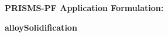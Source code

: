 \documentclass[10pt]{article}
\begin{document}
\def\Bomega{\mbox{\boldmath$\omega$}}
\def\Bvarepsilon{\mbox{\boldmath$\varepsilon$}}
\def\Bvartheta{\mbox{\boldmath$\vartheta$}}
\def\Bvarpi{\mbox{\boldmath$\varpi$}}
\def\Bvarrho{\mbox{\boldmath$\varrho$}}
\def\Bvarsigma{\mbox{\boldmath$\varsigma$}}
\def\Bvarphi{\mbox{\boldmath$\varphi$}}
\def\bone{\mathbf{1}}
\def\bzero{\mathbf{0}}
\def\bA{\mbox{\boldmath$ A$}}
\def\bB{\mbox{\boldmath$ B$}}
\def\bC{\mbox{\boldmath$ C$}}
\def\bD{\mbox{\boldmath$ D$}}
\def\bE{\mbox{\boldmath$ E$}}
\def\bF{\mbox{\boldmath$ F$}}
\def\bG{\mbox{\boldmath$ G$}}
\def\bH{\mbox{\boldmath$ H$}}
\def\bI{\mbox{\boldmath$ I$}}
\def\bJ{\mbox{\boldmath$ J$}}
\def\bK{\mbox{\boldmath$ K$}}
\def\bL{\mbox{\boldmath$ L$}}
\def\bM{\mbox{\boldmath$ M$}}
\def\bN{\mbox{\boldmath$ N$}}
\def\bO{\mbox{\boldmath$ O$}}
\def\bP{\mbox{\boldmath$ P$}}
\def\bQ{\mbox{\boldmath$ Q$}}
\def\bR{\mbox{\boldmath$ R$}}
\def\bS{\mbox{\boldmath$ S$}}
\def\bT{\mbox{\boldmath$ T$}}
\def\bU{\mbox{\boldmath$ U$}}
\def\bV{\mbox{\boldmath$ V$}}
\def\bW{\mbox{\boldmath$ W$}}
\def\bX{\mbox{\boldmath$ X$}}
\def\bY{\mbox{\boldmath$ Y$}}
\def\bZ{\mbox{\boldmath$ Z$}}
\def\ba{\mbox{\boldmath$ a$}}
\def\bb{\mbox{\boldmath$ b$}}
\def\bc{\mbox{\boldmath$ c$}}
\def\bd{\mbox{\boldmath$ d$}}
\def\be{\mbox{\boldmath$ e$}}
\def\bff{\mbox{\boldmath$ f$}}
\def\bg{\mbox{\boldmath$ g$}}
\def\bh{\mbox{\boldmath$ h$}}
\def\bi{\mbox{\boldmath$ i$}}
\def\bj{\mbox{\boldmath$ j$}}
\def\bk{\mbox{\boldmath$ k$}}
\def\bl{\mbox{\boldmath$ l$}}
\def\bm{\mbox{\boldmath$ m$}}
\def\bn{\mbox{\boldmath$ n$}}
\def\bo{\mbox{\boldmath$ o$}}
\def\bp{\mbox{\boldmath$ p$}}
\def\bq{\mbox{\boldmath$ q$}}
\def\br{\mbox{\boldmath$ r$}}
\def\bs{\mbox{\boldmath$ s$}}
\def\bt{\mbox{\boldmath$ t$}}
\def\bu{\mbox{\boldmath$ u$}}
\def\bv{\mbox{\boldmath$ v$}}
\def\bw{\mbox{\boldmath$ w$}}
\def\bx{\mbox{\boldmath$ x$}}
\def\by{\mbox{\boldmath$ y$}}
\def\bz{\mbox{\boldmath$ z$}}
\centerline{\Large{\bf PRISMS-PF Application Formulation:}}
\smallskip
\centerline{\Large{\bf alloySolidification}}
\bigskip
\end{document}
